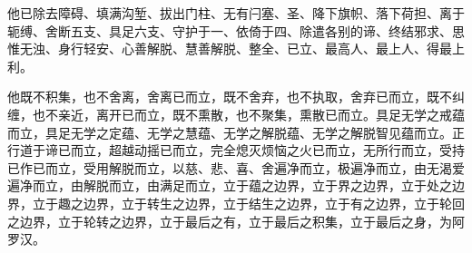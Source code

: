 
\begin{quoting}他已除去障碍、填满沟堑、拔出门柱、无有闩塞、圣、降下旗帜、落下荷担、离于轭缚、舍断五支、具足六支、守护于一、依倚于四、除遣各别的谛、终结邪求、思惟无浊、身行轻安、心善解脱、慧善解脱、整全、已立、最高人、最上人、得最上利。\end{quoting}


\begin{quoting}他既不积集，也不舍离，舍离已而立，既不舍弃，也不执取，舍弃已而立，既不纠缠，也不亲近，离开已而立，既不熏散，也不聚集，熏散已而立。具足无学之戒蕴而立，具足无学之定蕴、无学之慧蕴、无学之解脱蕴、无学之解脱智见蕴而立。正行道于谛已而立，超越动摇已而立，完全熄灭烦恼之火已而立，无所行而立，受持已作已而立，受用解脱而立，以慈、悲、喜、舍遍净而立，极遍净而立，由无渴爱遍净而立，由解脱而立，由满足而立，立于蕴之边界，立于界之边界，立于处之边界，立于趣之边界，立于转生之边界，立于结生之边界，立于有之边界，立于轮回之边界，立于轮转之边界，立于最后之有，立于最后之积集，立于最后之身，为阿罗汉。\end{quoting}


